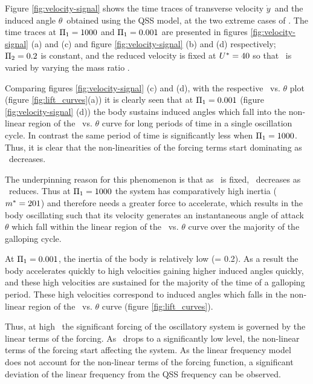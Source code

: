 


          

Figure \ref{fig:velocity-signal} shows the time traces of transverse velocity $\dot{y}$\ and the induced angle $\theta$\ obtained using the QSS model, at the two extreme cases of \massstiff. The time traces at $\Pi_1=1000$ and $\Pi_1=0.001$ are presented in figures  \ref{fig:velocity-signal} (a) and (c) and  figure \ref{fig:velocity-signal} (b) and (d) respectively; $\Pi_2=0.2$ is constant, and the reduced velocity is fixed at $U^{*}=40$ so that \massstiff\ is varied by varying the mass ratio \mstar.

Comparing figures \ref{fig:velocity-signal} (c) and (d), with the respective \cy\ vs. $\theta$ plot (figure \ref{fig:lift_curves}(a)) it is clearly seen that at $\Pi_1=0.001$ (figure \ref{fig:velocity-signal} (d)) the body sustains induced angles which fall into the non-linear region of the \cy\ vs. $\theta$ curve for long periods of time in a single oscillation cycle. In contrast the same period of time is significantly less when $\Pi_1=1000$. Thus, it is clear that the non-linearities of the forcing terms start dominating as \massstiff\ decreases. 

The underpinning reason for this phenomenon is that as \massdamp\ is fixed, \mstar\ decreases as \massstiff\ reduces. Thus at $\Pi_1=1000$ the system has comparatively high inertia ($m^{*}=201$) and therefore needs a greater force to accelerate, which results in the body oscillating such that its velocity generates an instantaneous angle of attack  $\theta$ which fall within the linear region of the \cy\ vs. $\theta$ curve over the majority of the galloping cycle.

 At $\Pi_1=0.001$, the inertia of the body is relatively low (\mstar= 0.2). As a result the body accelerates quickly to high velocities gaining higher induced angles quickly, and these high velocities are sustained for the majority of the time of a galloping period. These high velocities correspond to induced angles which falls in the non-linear  region of the \cy\ vs. $\theta$ curve (figure \ref{fig:lift_curves}). 

 Thus, at high \massstiff\, the significant forcing of the oscillatory system is governed by the linear terms of the forcing. As \massstiff\ drops to a significantly low level, the non-linear terms of the forcing start affecting the system. As the linear frequency model does not account for the non-linear terms of the forcing function, a significant deviation of the linear frequency from the QSS frequency can be observed.
